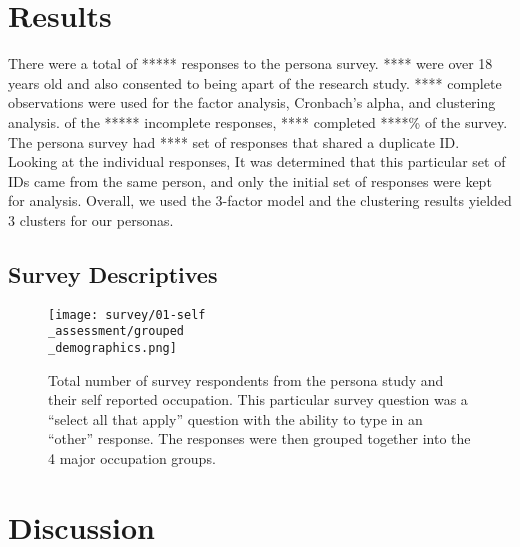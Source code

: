 \documentclass[../main.tex]{subfiles}
\begin{document}
\section{Results}

    There were a total of ***** responses to the persona survey.
    **** were over 18 years old and also consented to being apart of the research study.
    **** complete observations were used for the factor analysis, Cronbach's alpha, and clustering analysis.
    of the ***** incomplete responses,
    **** completed ****\% of the survey.
    The persona survey had **** set of responses that shared a duplicate ID.
    Looking at the individual responses,
    It was determined that this particular set of IDs came from the same person,
    and only the initial set of responses were kept for analysis.
    Overall, we used the 3-factor model and the clustering results yielded 3 clusters for our personas.

    \subsection{Survey Descriptives}

    \begin{figure}
        \centering
        \texttt{[image: survey/01-self\\\_assessment/grouped\\\_demographics.png]}
        \caption[Grouped demographics for persona survey respondents]
            {Total number of survey respondents from the persona study and their self reported occupation.
                This particular survey question was a ``select all that apply''
                question with the ability to type in an ``other'' response.
                The responses were then grouped together into the 4 major occupation groups.
            }
        \label{fig:groupeddemographics}
    \end{figure}


\section{Discussion}
\end{document}
